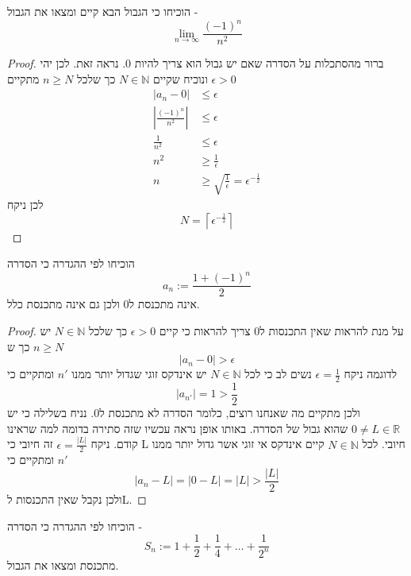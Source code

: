 \documentclass{article}
\begin{document}
\begin{exercise}
הוכיחו כי הגבול הבא קיים ומצאו את הגבול - 
\[\underset{n\rightarrow\infty}{\lim} \frac{(-1)^n }{n^2}\]
\end{exercise}

\begin{proof}
ברור מהסתכלות על הסדרה שאם יש גבול הוא צריך להיות 0. נראה זאת. לכן יהי 
$\epsilon>0$
ונוכיח שקיים 
$N\in\mathbb{N}$
כך שלכל 
$n\geq N$
מתקיים 
\begin{align*}
|a_n-0|&\leq\epsilon \\
\left|\frac{(-1)^n}{n^2}\right|&\leq \epsilon \\
\frac{1}{n^2}&\leq\epsilon \\
n^2&\geq \frac{1}{\epsilon} \\
n&\geq \sqrt{\frac{1}{\epsilon}} = \epsilon^{-\frac{1}{2}}
\end{align*}
לכן ניקח 
\[N = \left\lceil \epsilon^{-\frac{1}{2}}\right\rceil\]
\end{proof}

\begin{exercise}
הוכיחו לפי ההגדרה כי הסדרה 
\[a_n:=\frac{1+(-1)^n}{2}\]
אינה מתכנסת ל0 ולכן גם אינה מתכנסת כלל.
\end{exercise}

\begin{proof}
על מנת להראות שאין התכנסות ל0 צריך להראות כי קיים 
$\epsilon>0$
כך שלכל 
$N\in\mathbb{N}$
יש 
$n\geq N$
כך ש 
\[|a_n-0|>\epsilon\]
לדוגמה ניקח 
$\epsilon = \frac{1}{2}$
נשים לב כי לכל 
$N\in\mathbb{N}$
יש אינדקס זוגי שגדול יותר ממנו 
$n'$
ומתקיים כי
\[|a_{n'}| = 1>\frac{1}{2}\]
ולכן מתקיים מה שאנחנו רוצים, כלומר הסדרה לא מתכנסת ל0. נניח בשלילה כי יש 
$0\neq L\in\mathbb{R}$
שהוא גבול של הסדרה. באותו אופן נראה עכשיו שזה סתירה בדומה למה שראינו קודם. ניקח 
$\epsilon=\frac{|L|}{2}$ 
זה חיובי כי L חיובי. לכל 
$N\in\mathbb{N}$
קיים אינדקס אי זוגי אשר גדול יותר ממנו 
$n'$
ומתקיים כי
\[|a_n - L| = |0-L| = |L|> \frac{|L|}{2}\]
ולכן נקבל שאין התכנסות לL. 
\end{proof}

\begin{exercise}
הוכיחו לפי ההגדרה כי הסדרה -
\[S_n:=1+\frac{1}{2}+\frac{1}{4}+\dots+\frac{1}{2^n}\]
מתכנסת ומצאו את הגבול.
\end{exercise}
\end{document}
